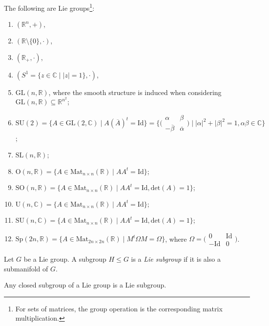 \documentclass[misc]{subfiles}
\begin{document}
\begin{Exp}\label{Exp: Lie group}

    The following are Lie groups\footnote{For sets of matrices, the group operation is the corresponding matrix multiplication.}:
    \begin{enumerate}
    
        \item $(\mathbb{R}^n,+)$,

        \item $(\mathbb{R}\setminus\{0\},\cdot)$,

        \item $(\mathbb{R}_+,\cdot)$,

        \item $(S^1 = \{z\in\mathbb{C} \mid |z|=1\},\cdot)$,

        \item $\text{GL}(n,\mathbb{R})$, where the smooth structure is induced when considering $\text{GL}(n,\mathbb{R})\subseteq \mathbb{R}^{n^2}$;

        \item $\text{SU}(2) = \{A\in\text{GL}(2,\mathbb{C}) \mid A (\overline{A})^{t}=\text{Id}\} = \big\{ \big( \begin{smallmatrix} \alpha &\beta \\ -\overline{\beta} &\overline{\alpha} \end{smallmatrix} \big) \mid |\alpha|^2 + |\beta|^2 = 1, \alpha\beta\in\mathbb{C}\big\}$;

        \item $\text{SL}(n,\mathbb{R})$;

        \item $\text{O}(n,\mathbb{R}) = \{A\in\text{Mat}_{n\times n}(\mathbb{R}) \mid A A^t=\text{Id}\}$;

        \item $\text{SO}(n,\mathbb{R}) = \{A\in\text{Mat}_{n\times n}(\mathbb{R}) \mid A A^t=\text{Id}, \text{det}(A)=1\}$;

        \item $\text{U}(n,\mathbb{C}) = \{A\in\text{Mat}_{n\times n}(\mathbb{R}) \mid A A^t=\text{Id}\}$;

        \item $\text{SU}(n,\mathbb{C}) = \{A\in\text{Mat}_{n\times n}(\mathbb{R}) \mid A A^t=\text{Id}, \text{det}(A)=1\}$;

        \item $\text{Sp}(2n,\mathbb{R}) = \{A\in\text{Mat}_{2n\times 2n}(\mathbb{R}) \mid M^t\Omega M=\Omega\}$, where $\Omega = \big(\begin{smallmatrix} 0 &\text{Id} \\ -\text{Id} &0 \end{smallmatrix}\big)$.
    \end{enumerate}
\end{Exp}

\begin{Dfn}\label{Dfn: Lie subgroup}
    Let $G$ be a Lie group. A subgroup $H\le G$ is a \emph{Lie subgroup} if it is also a submanifold of $G$.
\end{Dfn}

\begin{Nt}
    Any closed subgroup of a Lie group is a Lie subgroup.
\end{Nt}
\end{document}
